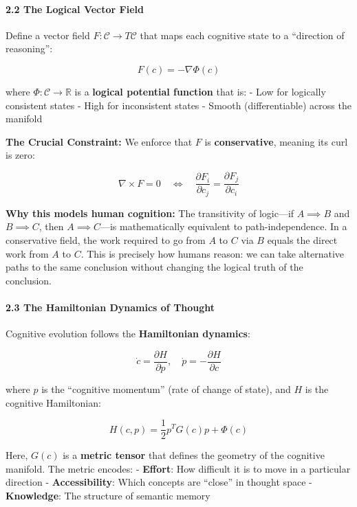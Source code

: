 \documentclass[
  11pt,
  a4paper,
]{article}
\begin{document}
\paragraph{2.2 The Logical Vector Field}\label{the-logical-vector-field}

Define a vector field \(F: \mathcal{C} \to T\mathcal{C}\) that maps each
cognitive state to a ``direction of reasoning'':

\[F(c) = -\nabla \Phi(c)\]

where \(\Phi: \mathcal{C} \to \mathbb{R}\) is a \textbf{logical
potential function} that is: - Low for logically consistent states -
High for inconsistent states - Smooth (differentiable) across the
manifold

\textbf{The Crucial Constraint:} We enforce that \(F\) is
\textbf{conservative}, meaning its curl is zero:

\[\nabla \times F = 0 \quad \Longleftrightarrow \quad \frac{\partial F_i}{\partial c_j} = \frac{\partial F_j}{\partial c_i}\]

\textbf{Why this models human cognition:} The transitivity of logic---if
\(A \implies B\) and \(B \implies C\), then \(A \implies C\)---is
mathematically equivalent to path-independence. In a conservative field,
the work required to go from \(A\) to \(C\) via \(B\) equals the direct
work from \(A\) to \(C\). This is precisely how humans reason: we can
take alternative paths to the same conclusion without changing the
logical truth of the conclusion.

\paragraph{2.3 The Hamiltonian Dynamics of
Thought}\label{the-hamiltonian-dynamics-of-thought}

Cognitive evolution follows the \textbf{Hamiltonian dynamics}:

\[\dot{c} = \frac{\partial H}{\partial p}, \quad \dot{p} = -\frac{\partial H}{\partial c}\]

where \(p\) is the ``cognitive momentum'' (rate of change of state), and
\(H\) is the cognitive Hamiltonian:

\[H(c, p) = \frac{1}{2} p^T G(c) p + \Phi(c)\]

Here, \(G(c)\) is a \textbf{metric tensor} that defines the geometry of
the cognitive manifold. The metric encodes: - \textbf{Effort}: How
difficult it is to move in a particular direction -
\textbf{Accessibility}: Which concepts are ``close'' in thought space -
\textbf{Knowledge}: The structure of semantic memory
\end{document}
